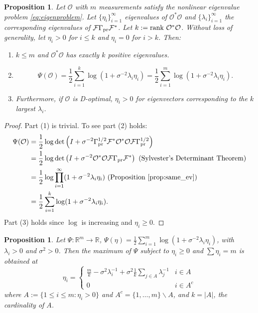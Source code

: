 \documentclass[ba]{imsart}
\newcommand{\obs}{\mathcal{O}}
\newcommand{\fwd}{\mathcal{F}}
\newcommand{\tar}{\Psi}
\newcommand{\rank}{\textup{rank}\ }
\theoremstyle{plain}
\newtheorem{proposition}[theorem]{Proposition}
\theoremstyle{definition}
\theoremstyle{remark}
\begin{document}
\begin{proposition}\label{prop:true_target}
  Let $\obs$ with $m$ measurements satisfy the nonlinear eigenvalue
  problem \eqref{eq:eigenproblem}. Let $\{\eta_i\}_{i=1}^{\infty}$
  eigenvalues of $\obs^*\obs$ and $\{\lambda_i\}_{i=1}^{\infty}$ the
  corresponding eigenvalues of $\fwd \prcov \fwd^*$. Let $k:=\rank
  \obs^*\obs$. Without loss of generality, let $\eta_i > 0$ for $i\leq
  k$ and $\eta_i = 0$ for $i > k$. Then:
  \begin{enumerate}
    \item $k \leq m$ and $\obs^*\obs$ has exactly $k$ positive
      eigenvalues.
    \item
      \begin{equation*}
        \tar(\obs) = \frac12 \sum_{i=1}^{k} \log (1 + \sigma^{-2}\lambda_i\eta_i) = \frac12 \sum_{i=1}^{m} \log (1 + \sigma^{-2}\lambda_i\eta_i).
      \end{equation*}
    \item Furthermore, if $\obs$ is D-optimal, $\eta_i > 0$ for
      eigenvectors corresponding to the $k$ largest $\lambda_i$.
  \end{enumerate}
\end{proposition}
\begin{proof}
  Part (1) is trivial. To see part (2) holds: 
  \begin{align}
    \begin{split}
      \tar(\obs) &= \frac12\log \det \left (I + \sigma^{-2} \prcov^{1/2} \fwd ^* \obs^*
      \obs \fwd \prcov^{1/2}\right )\\&= \frac12 \log \det \left (I + \sigma^{-2} \obs^* \obs \fwd
      \prcov\fwd^* \right ) \text{ (Sylvester's Determinant
      Theorem)}\\
&=\frac12 \log \prod_{i=1}^{\infty} ( 1 + \sigma^{-2} \lambda_i\eta_i ) \text{ (Proposition \ref{prop:same_ev})} \\
&=\frac12 \sum_{i=1}^{k} \log (1 + \sigma^{-2}\lambda_i\eta_i). 
\end{split}
  \end{align}
  Part (3) holds since $\log$ is increasing and $\eta_i \geq 0$.
\end{proof}


\begin{proposition}\label{prop:kkt}
  Let $\tar: \mathbb{R}^m \to \mathbb{R}$, $\tar(\eta) =
  \frac{1}{2}\sum_{i=1}^m \log (1+\sigma^{-2}\lambda_i \eta_i)$, with
  $\lambda_i > 0$ and $\sigma^{2} > 0$. Then the maximum of $\tar$
  subject to $\eta_i \geq 0$ and $\sum\eta_i = m$ is obtained at
  \begin{equation}
  \eta_i = \begin{cases}
    \frac{m}{k} - \sigma^2 \lambda_i^{-1} + \sigma^2 \frac{1}{k} \sum_{j\in A} \lambda_j^{-1} & i \in A \\
    0 & i \in A^c
  \end{cases}
  \end{equation}
  where $A:= \{1\leq i \leq m: \eta_i > 0\}$ and $A^c = \{1,\dots, m\}
  \backslash A$, and $k = |A|$, the cardinality of $A$.
\end{proposition}
\end{document}
